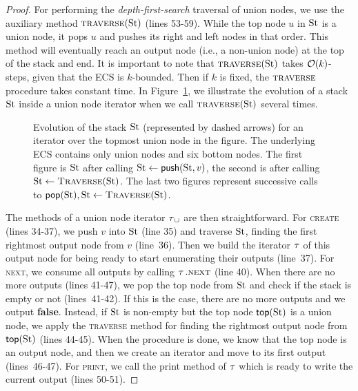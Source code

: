 \begin{proof}
For performing the \emph{depth-first-search} traversal of union nodes, we use the auxiliary method $\textsc{traverse}(\operatorname{St})$ (lines 53-59). While the top node $u$ in $\operatorname{St}$ is a union node, it pops $u$ and pushes its right and left nodes in that order. 
This method will eventually reach an output node (i.e., a non-union node) at the top of the stack and end. 
It is important to note that $\textsc{traverse}(\operatorname{St})$ takes $\mathcal{O}(k)$-steps, given that the ECS is $k$-bounded. Then if $k$ is fixed, the  $\textsc{traverse}$ procedure takes constant time. In Figure~\ref{nested:fig-enum-stacks}, we illustrate the evolution of a stack $\operatorname{St}$ inside a union node iterator when we call $\textsc{traverse}(\operatorname{St})$ several times. 
\begin{figure}[t]
	\centering
	
	\caption{Evolution of the stack $\operatorname{St}$ (represented by dashed arrows) for an iterator over the topmost union node in the figure. The underlying ECS contains only union nodes and six bottom nodes. The first figure is $\operatorname{St}$ after calling $\operatorname{St} \gets {\sf push}(\operatorname{St}, v)$, the second is after calling $\operatorname{St} \gets\textsc{Traverse}(\operatorname{St})$. The last two figures represent successive calls to ${\sf pop}(\operatorname{St}), \operatorname{St} \gets\textsc{Traverse}(\operatorname{St})$.}
	\label{nested:fig-enum-stacks}
\end{figure}

The methods of a union node iterator $\operatorname{\tau}_\cup$ are then straightforward. For \textsc{create} (lines 34-37), we push $v$ into $\operatorname{St}$ (line 35) and traverse $\operatorname{St}$, finding the first rightmost output node from $v$ (line~36). Then we build the iterator $\operatorname{\tau}$ of this output node for being ready to start enumerating their outputs (line~37). 
For \textsc{next}, we consume all outputs by calling $\operatorname{\tau}.\textsc{next}$ (line 40). When there are no more outputs (lines 41-47), we pop the top node from $\operatorname{St}$ and check if the stack is empty or not (lines~41-42). If this is the case, there are no more outputs and we output {\bf false}. Instead, if $\operatorname{St}$ is non-empty but the top node $\text{\sf top}(\operatorname{St})$ is a union node, we apply the \textsc{traverse} method for finding the rightmost output node from $\text{\sf top}(\operatorname{St})$ (lines 44-45). When the procedure is done, we know that the top node is an output node, and then we create an iterator and move to its first output (lines~46-47). 
For \textsc{print}, we call the print method of $\operatorname{\tau}$ which is ready to write the current output (lines 50-51). 


\end{proof}
